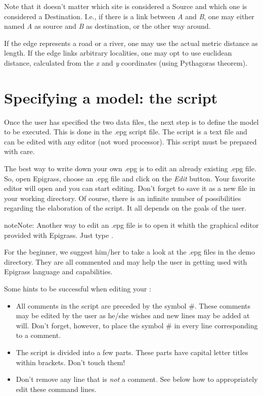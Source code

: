 \documentclass[a4paper,10pt,english]{sphinxmanual}
\begin{document}
Note that it doesn't matter which site is considered a Source and which one is considered a Destination. I.e., if there is a link between \emph{A} and \emph{B}, one may either named \emph{A} as source and \emph{B} as destination, or the other way around.

If the edge represents a road or a river, one may use the actual metric distance as length. If the edge links arbitrary localities, one may opt to use euclidean distance, calculated from the \emph{x} and \emph{y} coordinates (using Pythagoras theorem).


\section{Specifying a model: the script}
\label{using:specifying-a-model-the-script}
Once the user has specified the two data files, the next step is to define the model to be executed. This is done in the .epg script file. The    script is a text file and can be edited with any editor (not word processor). This script must be prepared with care.

The best way to write down your own .epg is to edit an already existing .epg file. So, open Epigrass, choose an .epg file and click on the \emph{Edit} button. Your favorite editor will open and you can start editing. Don't forget to save it as a new file in your working directory. Of course, there is an infinite number of possibilities regarding the elaboration of the script. It all depends on the goals of the user.

\begin{notice}{note}{Note:}
Another way to edit an .epg file is to open it whith the graphical editor provided with Epigrass. Just type .
\end{notice}

For the beginner, we suggest him/her to take a look at the .epg files in the demo directory. They are all commented and may help the user in getting used with Epigrass language and capabilities.

Some hints to be successful when editing your   :
\begin{itemize}
\item {} 
All comments in the script are preceded by the symbol \#. These comments may be edited by the user as he/she wishes and new lines may be added at will. Don't forget, however, to place the symbol \# in every line corresponding to a comment.

\item {} 
The script is divided into a few parts. These parts have capital letter titles within brackets. Don't touch them!

\item {} 
Don't remove any line that is \emph{not} a comment. See below how to appropriately edit these command lines.

\end{itemize}
\end{document}
